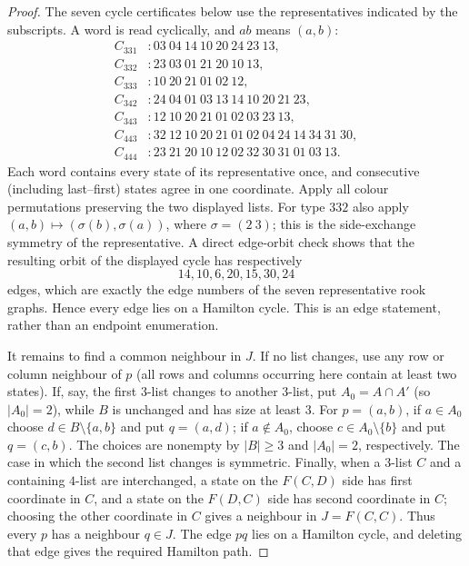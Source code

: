 \begin{proof}
The seven cycle certificates below use the representatives indicated by the
subscripts.  A word is read cyclically, and $ab$ means $(a,b)$:
\[
\begin{aligned}
 C_{331}&:03\ 04\ 14\ 10\ 20\ 24\ 23\ 13,\\
 C_{332}&:23\ 03\ 01\ 21\ 20\ 10\ 13,\\
 C_{333}&:10\ 20\ 21\ 01\ 02\ 12,\\
 C_{342}&:24\ 04\ 01\ 03\ 13\ 14\ 10\ 20\ 21\ 23,\\
 C_{343}&:12\ 10\ 20\ 21\ 01\ 02\ 03\ 23\ 13,\\
 C_{443}&:32\ 12\ 10\ 20\ 21\ 01\ 02\ 04\ 24\ 14\ 34\ 31\ 30,\\
 C_{444}&:23\ 21\ 20\ 10\ 12\ 02\ 32\ 30\ 31\ 01\ 03\ 13.
\end{aligned}
\]
Each word contains every state of its representative once, and consecutive
(including last--first) states agree in one coordinate.  Apply all colour
permutations preserving the two displayed lists.  For type $332$ also apply
$(a,b)\mapsto(\sigma(b),\sigma(a))$, where $\sigma=(2\ 3)$; this is the
side-exchange symmetry of the representative.  A direct edge-orbit check
shows that the resulting orbit of the displayed cycle has respectively
\[
 14,10,6,20,15,30,24
\]
edges, which are exactly the edge numbers of the seven representative
rook graphs.  Hence every edge lies on a Hamilton cycle.  This is an
edge statement, rather than an endpoint enumeration.

It remains to find a common neighbour in $J$.  If no list changes, use any
row or column neighbour of $p$ (all rows and columns occurring here contain
at least two states).  If, say, the first $3$-list changes to another
$3$-list, put $A_0=A\cap A'$ (so $|A_0|=2$), while $B$ is unchanged and has
size at least $3$.  For $p=(a,b)$, if $a\in A_0$ choose
$d\in B\setminus\{a,b\}$ and put $q=(a,d)$; if $a\notin A_0$, choose
$c\in A_0\setminus\{b\}$ and put $q=(c,b)$.  The choices are nonempty by
$|B|\ge3$ and $|A_0|=2$, respectively.  The case in which the second list
changes is symmetric.  Finally, when a $3$-list $C$ and a containing
$4$-list are interchanged, a state on the $F(C,D)$ side has first coordinate
in $C$, and a state on the $F(D,C)$ side has second coordinate in $C$;
choosing the other coordinate in $C$ gives a neighbour in
$J=F(C,C)$.  Thus every $p$ has a neighbour $q\in J$.  The edge $pq$ lies
on a Hamilton cycle, and deleting that edge gives the required Hamilton
path.
\end{proof}

